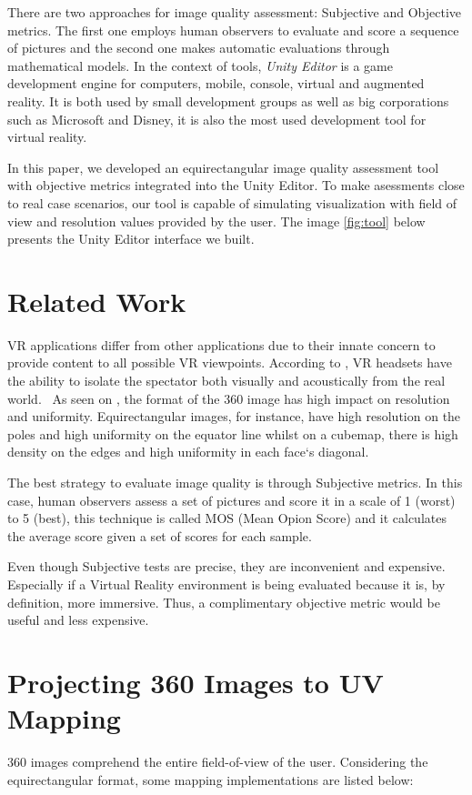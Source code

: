 \documentclass[12pt]{article}
\begin{document}
There are two approaches for image quality assessment: Subjective  and Objective metrics. The first one employs human observers to evaluate and score a sequence of pictures and the second one makes automatic evaluations through mathematical models. In the context of tools, \textit{Unity Editor} is a game development engine for computers, mobile, console, virtual and augmented reality. It is both used by small development groups as well as big corporations such as Microsoft and Disney, it is also the most used development tool for virtual reality.

In this paper, we developed an equirectangular image quality assessment tool with objective metrics integrated into the Unity Editor. To make asessments close to real case scenarios, our tool is capable of simulating visualization with field of view and resolution values provided by the user. The image \ref{fig:tool} below presents the Unity Editor interface we built. 

\section{Related Work}
VR applications differ from other applications due to their innate concern to provide content to all possible VR viewpoints. According to \cite{fuchs2017virtual}, VR headsets have the ability to isolate the spectator both visually and acoustically from the real world.
~As seen on \cite{dunn2017resolution}, the format of the 360 image has high impact on resolution and uniformity. Equirectangular images, for instance, have high resolution on the poles and high uniformity on the equator line whilst on a cubemap, there is high density on the edges and high uniformity in each face`s diagonal.

The best strategy to evaluate image quality is through Subjective metrics. In this case, human observers assess a set of pictures and score it in a scale of 1 (worst) to 5 (best), this technique is called MOS (Mean Opion Score) and it calculates the average score given a set of scores for each sample.

Even though Subjective tests are precise, they are inconvenient and expensive. Especially if a Virtual Reality environment is being evaluated because it is, by definition, more immersive. Thus, a complimentary objective metric would be useful and less expensive.

\section{Projecting 360 Images to UV Mapping}
360 images comprehend the entire field-of-view of the user. Considering the equirectangular format, some mapping implementations are listed below:
\end{document}
